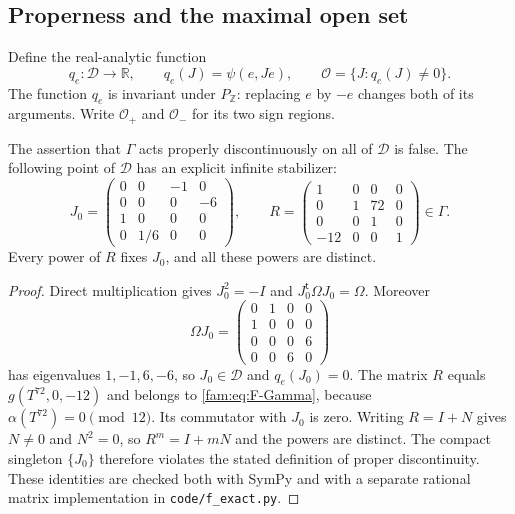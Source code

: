 \subsection{Properness and the maximal open set}\label{fam:section:F.2}

Define the real-analytic function
\[
 q_e:\mathcal D\longrightarrow\mathbb R,\qquad q_e(J)=\psi(e,Je),
 \qquad\mathcal O=\{J:q_e(J)\ne0\}.
\]
The function $q_e$ is invariant under $P_{\mathbb Z}$: replacing $e$ by
$-e$ changes both of its arguments.  Write $\mathcal O_+$ and
$\mathcal O_-$ for its two sign regions.

\begin{proposition}[counterexample]\label{fam:src:F.2.1}\label{fam:st:F.2.1}
The assertion that $\Gamma$ acts properly discontinuously on all of
$\mathcal D$ is false.  The following point of $\mathcal D$ has an
explicit infinite stabilizer:
\[
 J_0=\begin{pmatrix}
 0&0&-1&0\\0&0&0&-6\\1&0&0&0\\0&1/6&0&0
 \end{pmatrix},\qquad
 R=\begin{pmatrix}
 1&0&0&0\\0&1&72&0\\0&0&1&0\\-12&0&0&1
 \end{pmatrix}\in\Gamma.
\]
Every power of $R$ fixes $J_0$, and all these powers are distinct.
\end{proposition}


\begin{proof}
Direct multiplication gives $J_0^2=-I$ and
$J_0^{\mathsf t}\Omega J_0=\Omega$.  Moreover
\[
 \Omega J_0=\begin{pmatrix}
 0&1&0&0\\1&0&0&0\\0&0&0&6\\0&0&6&0
 \end{pmatrix}
\]
has eigenvalues $1,-1,6,-6$, so $J_0\in\mathcal D$ and $q_e(J_0)=0$.
The matrix $R$ equals $g(T^{72},0,-12)$ and belongs to \eqref{fam:eq:F-Gamma},
because $\alpha(T^{72})=0\pmod{12}$.  Its commutator with $J_0$ is zero.
Writing $R=I+N$ gives $N\ne0$ and $N^2=0$, so $R^m=I+mN$ and the
powers are distinct.  The compact singleton $\{J_0\}$ therefore violates
the stated definition of proper discontinuity.  These identities are
checked both with SymPy and with a separate rational matrix
implementation in \texttt{code/f\_exact.py}.
\end{proof}

